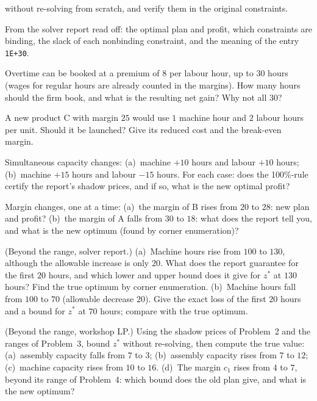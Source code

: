 \begin{problems}
        without re-solving from scratch, and verify them in the original
        constraints.
  \item From the solver report read off: the optimal plan and profit,
        which constraints are binding, the slack of each nonbinding
        constraint, and the meaning of the entry \texttt{1E+30}.
  \item Overtime can be booked at a premium of $8$ per labour hour, up to
        $30$ hours (wages for regular hours are already counted in the
        margins). How many hours should the firm book, and what is the
        resulting net gain? Why not all $30$?
  \item A new product C with margin $25$ would use $1$ machine hour and
        $2$ labour hours per unit. Should it be launched? Give its reduced
        cost and the break-even margin.
  \item Simultaneous capacity changes: (a)~machine $+10$ hours and labour
        $+10$ hours; (b)~machine $+15$ hours and labour $-15$ hours. For
        each case: does the 100\%-rule certify the report's shadow prices,
        and if so, what is the new optimal profit?
  \item Margin changes, one at a time: (a)~the margin of B rises from
        $20$ to $28$: new plan and profit? (b)~the margin of A falls
        from $30$ to $18$: what does the report tell you, and what is
        the new optimum (found by corner enumeration)?
  \item (Beyond the range, solver report.) (a)~Machine hours rise from
        $100$ to $130$, although the allowable increase is only $20$.
        What does the report guarantee for the first $20$ hours, and which
        lower and upper bound does it give for $z^{*}$ at $130$ hours?
        Find the true optimum by corner enumeration. (b)~Machine hours fall
        from $100$ to $70$ (allowable decrease $20$). Give the exact loss
        of the first $20$ hours and a bound for $z^{*}$ at $70$ hours;
        compare with the true optimum.
  \item (Beyond the range, workshop LP.) Using the shadow prices of
        Problem~2 and the ranges of Problem~3, bound $z^{*}$ without
        re-solving, then compute the true value: (a)~assembly capacity
        falls from $7$ to $3$; (b)~assembly capacity rises from $7$ to
        $12$; (c)~machine capacity rises from $10$ to $16$. (d)~The margin
        $c_{1}$ rises from $4$ to $7$, beyond its range of Problem~4:
        which bound does the old plan give, and what is the new optimum?
\end{problems}


